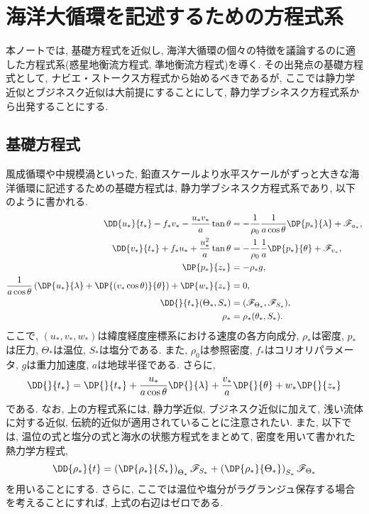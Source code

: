 \chapter{海洋大循環を記述するための方程式系}
本ノートでは, 基礎方程式を近似し, 海洋大循環の個々の特徴を議論するのに適した方程式系(惑星地衡流方程式, 準地衡流方程式)を導く. 
その出発点の基礎方程式として, ナビエ・ストークス方程式から始めるべきであるが, 
ここでは静力学近似とブジネスク近似は大前提にすることにして, 
静力学ブシネスク方程式系から出発することにする. 

\section{基礎方程式}
風成循環や中規模渦といった, 鉛直スケールより水平スケールがずっと大きな海洋循環に記述するための基礎方程式は, 
静力学ブシネスク方程式系であり, 以下のように書かれる. 
\begin{subequations} %
  \begin{align}
    \DD{u_*}{t_*} - f_* v_* - \dfrac{u_* v_*}{a} \tan \theta  &= - \dfrac{1}{\rho_0} \dfrac{1}{a \cos \theta} \DP{p_*}{\lambda} + \mathscr{F}_{u_*}, \\
    \DD{v_*}{t_*} + f_* u_* + \dfrac{u_*^2}{a} \tan \theta &= - \dfrac{1}{\rho_0} \dfrac{1}{a} \DP{p_*}{\theta} + \mathscr{F}_{v_*}, \\
    \DP{p_*}{z_*} &= - \rho_* g, \\
    \dfrac{1}{a \cos \theta} \left( \DP{u_*}{\lambda} + \DP{ (v_* \cos{\theta})}{\theta} \right)  + \DP{w_*}{z_*} &= 0, \\
    \DD{}{t_*} (\Theta_*, S_*) &= (\mathscr{F}_{\Theta_*}, \mathscr{F}_{S_*}), \\
    \rho_* &= \rho_* (\theta_*, S_*). 
  \end{align}
  \label{eq:basic_system}
\end{subequations}
ここで, $(u_*,v_*,w_*)$は緯度経度座標系における速度の各方向成分, 
$\rho_*$は密度, $p_*$は圧力, $\Theta_*$は温位, $S_*$は塩分である. 
また, $\rho_0$は参照密度, $f_*$はコリオリパラメータ, $g$は重力加速度, 
$a$は地球半径である. 
さらに, 
\begin{equation}
  \DD{}{t_*} =  \DP{}{t_*} + \dfrac{u_*}{a \cos \theta}\DP{}{\lambda} + \dfrac{v_*}{a} \DP{}{\theta} + w_* \DP{}{z_*}
\end{equation}
である. 
なお, 上の方程式系には, 静力学近似, ブジネスク近似に加えて, 
浅い流体に対する近似, 伝統的近似が適用されていることに注意されたい. 
また, 以下では, 温位の式と塩分の式と海水の状態方程式をまとめて, 密度を用いて書かれた熱力学方程式, 
\begin{align}
 \DD{\rho_*}{t} = \left(\DP{\rho_*}{S_*}\right)_{\Theta_*} \mathscr{F}_{S_*} + \left(\DP{\rho_*}{\Theta_*}\right)_{S_*} \mathscr{F}_{\Theta_*} 
\end{align}
を用いることにする. 
さらに, ここでは温位や塩分がラグランジュ保存する場合を考えることにすれば, 
上式の右辺はゼロである. 

